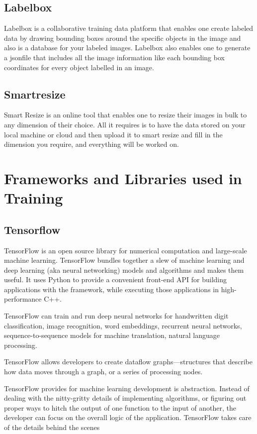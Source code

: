 \documentclass[12pt]{report}
\begin{document}
\subsection {Labelbox}
Labelbox is a collaborative training data platform that enables one create labeled data by drawing bounding boxes around the specific objects in the image and also is a database for your labeled images. Labelbox also enables one to generate a jsonfile that includes all the image information like each bounding box coordinates for every object labelled in an image\cite{labelbox}.

\subsection {Smartresize}
Smart Resize is an online tool that enables one to resize their images in bulk to any dimension of their choice. All it requires is to have the data stored on your local machine or cloud and then upload it to smart resize and fill in the dimension you require, and everything will be worked on\cite{Smartresize}.

\section{Frameworks and Libraries used in Training}
\subsection{Tensorflow}
TensorFlow is an open source library for numerical computation and large-scale machine learning. TensorFlow bundles together a slew of machine learning and deep learning (aka neural networking) models and algorithms and makes them useful. It uses Python to provide a convenient front-end API for building applications with the framework, while executing those applications in high-performance C++.

TensorFlow can train and run deep neural networks for handwritten digit classification, image recognition, word embeddings, recurrent neural networks, sequence-to-sequence models for machine translation, natural language processing.

TensorFlow allows developers to create dataflow graphs—structures that describe how data moves through a graph, or a series of processing nodes. 

TensorFlow provides for machine learning development is abstraction. Instead of dealing with the nitty-gritty details of implementing algorithms, or figuring out proper ways to hitch the output of one function to the input of another, the developer can focus on the overall logic of the application. TensorFlow takes care of the details behind the scenes\cite{Tensor}
\end{document}
